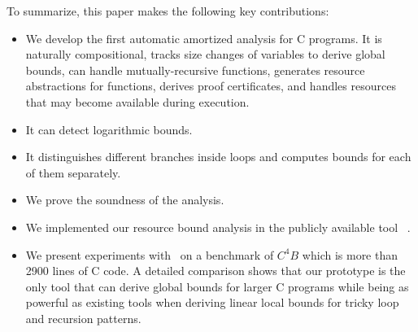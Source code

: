 To summarize, this paper makes the following key contributions:
\vspace{-0.1cm}
\begin{itemize}
	\item We develop the first automatic amortized analysis for C programs. It is naturally compositional, tracks size changes of variables to derive global bounds, can handle mutually-recursive
	functions, generates resource abstractions for functions, derives
	proof certificates, and handles resources that may become available during execution.
	
	\item It can detect logarithmic bounds.
	
	\item It distinguishes diﬀerent branches inside loops and computes bounds for each of them separately.
	
	\item We prove the soundness of the analysis.
	
	\item We implemented our resource bound analysis in the publicly available tool \SystemName\ .
	\item We present experiments with \SystemName\ on a benchmark of $C^{4}B$ which is more than 2900 lines of C code. A detailed comparison shows that our prototype is the only tool that can derive global bounds for larger C programs while being as powerful as existing tools when deriving linear local bounds for tricky loop and recursion patterns.
\end{itemize}





